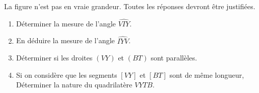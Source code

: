 \begin{exercice}
   La figure n'est pas en vraie grandeur. Toutes les réponses devront être justifiées.
   \begin{enumerate}
      \item Déterminer la mesure de l'angle $\widehat{VIY}$.
      \item En déduire la mesure de l'angle $\widehat{IYV}$.
      \item Déterminer si les droites $(VY)$ et $(BT)$ sont parallèles.
      \item Si on considère que les segments $[VY]$ et $[BT]$ sont de même longueur, Déterminer la nature du quadrilatère $VYTB$.\\
\end{enumerate}
\end{exercice}

